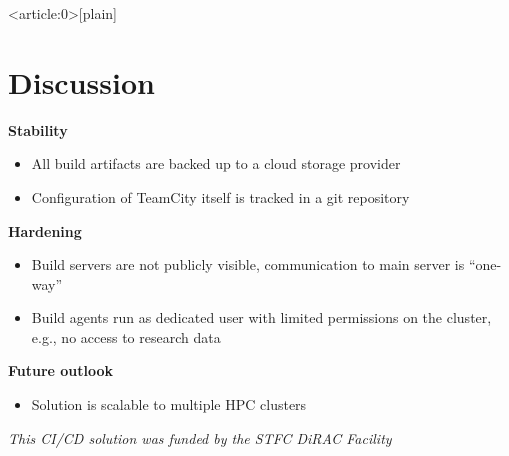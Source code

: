 \documentclass[english,xcolor=pst,11pt]{beamer}
\begin{document}
{ %
    \begin{frame}<article:0>[plain]
     \end{frame}
}

\section{Discussion}
\begin{frame}
 \textbf{Stability}
 \begin{itemize}
  \item All build artifacts are backed up to a cloud storage provider
  \item Configuration of TeamCity itself is tracked in a git repository
  \end{itemize}
  \textbf{Hardening}
  \begin{itemize}
  \item Build servers are not publicly visible, communication to main server is ``one-way''
  \item Build agents run as dedicated  user with limited permissions on the cluster, e.g., no access to research data
 \end{itemize}
 \textbf{Future outlook}

 \begin{itemize}
  \item Solution is scalable to multiple HPC clusters
 \end{itemize}
 \vfill
\emph{This CI/CD solution was funded by the STFC DiRAC Facility}
\end{frame}
\end{document}
